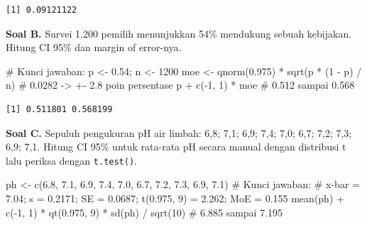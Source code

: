 \documentclass[
  indonesian,
  letterpaper,
]{book}
\newenvironment{Shaded}{\begin{snugshade}}{\end{snugshade}}
\newcommand{\CommentTok}[1]{\textcolor[rgb]{0.37,0.37,0.37}{#1}}
\newcommand{\DecValTok}[1]{\textcolor[rgb]{0.68,0.00,0.00}{#1}}
\newcommand{\FloatTok}[1]{\textcolor[rgb]{0.68,0.00,0.00}{#1}}
\newcommand{\FunctionTok}[1]{\textcolor[rgb]{0.28,0.35,0.67}{#1}}
\newcommand{\NormalTok}[1]{\textcolor[rgb]{0.00,0.23,0.31}{#1}}
\newcommand{\OtherTok}[1]{\textcolor[rgb]{0.00,0.23,0.31}{#1}}
\newcommand{\SpecialCharTok}[1]{\textcolor[rgb]{0.37,0.37,0.37}{#1}}
\begin{document}
\begin{verbatim}
[1] 0.09121122
\end{verbatim}

\textbf{Soal B.} Survei 1.200 pemilih menunjukkan 54\% mendukung sebuah
kebijakan. Hitung CI 95\% dan margin of error-nya.

\begin{Shaded}
\begin{Highlighting}[]
\CommentTok{\# Kunci jawaban:}
\NormalTok{p }\OtherTok{\textless{}{-}} \FloatTok{0.54}\NormalTok{; n }\OtherTok{\textless{}{-}} \DecValTok{1200}
\NormalTok{moe }\OtherTok{\textless{}{-}} \FunctionTok{qnorm}\NormalTok{(}\FloatTok{0.975}\NormalTok{) }\SpecialCharTok{*} \FunctionTok{sqrt}\NormalTok{(p }\SpecialCharTok{*}\NormalTok{ (}\DecValTok{1} \SpecialCharTok{{-}}\NormalTok{ p) }\SpecialCharTok{/}\NormalTok{ n)   }\CommentTok{\# 0.0282 {-}\textgreater{} +{-} 2.8 poin persentase}
\NormalTok{p }\SpecialCharTok{+} \FunctionTok{c}\NormalTok{(}\SpecialCharTok{{-}}\DecValTok{1}\NormalTok{, }\DecValTok{1}\NormalTok{) }\SpecialCharTok{*}\NormalTok{ moe                            }\CommentTok{\# 0.512 sampai 0.568}
\end{Highlighting}
\end{Shaded}

\begin{verbatim}
[1] 0.511801 0.568199
\end{verbatim}

\textbf{Soal C.} Sepuluh pengukuran pH air limbah: 6,8; 7,1; 6,9; 7,4;
7,0; 6,7; 7,2; 7,3; 6,9; 7,1. Hitung CI 95\% untuk rata-rata pH secara
manual dengan distribusi t lalu periksa dengan \texttt{t.test()}.

\begin{Shaded}
\begin{Highlighting}[]
\NormalTok{ph }\OtherTok{\textless{}{-}} \FunctionTok{c}\NormalTok{(}\FloatTok{6.8}\NormalTok{, }\FloatTok{7.1}\NormalTok{, }\FloatTok{6.9}\NormalTok{, }\FloatTok{7.4}\NormalTok{, }\FloatTok{7.0}\NormalTok{, }\FloatTok{6.7}\NormalTok{, }\FloatTok{7.2}\NormalTok{, }\FloatTok{7.3}\NormalTok{, }\FloatTok{6.9}\NormalTok{, }\FloatTok{7.1}\NormalTok{)}
\CommentTok{\# Kunci jawaban:}
\CommentTok{\# x{-}bar = 7.04; s = 0.2171; SE = 0.0687; t(0.975, 9) = 2.262; MoE = 0.155}
\FunctionTok{mean}\NormalTok{(ph) }\SpecialCharTok{+} \FunctionTok{c}\NormalTok{(}\SpecialCharTok{{-}}\DecValTok{1}\NormalTok{, }\DecValTok{1}\NormalTok{) }\SpecialCharTok{*} \FunctionTok{qt}\NormalTok{(}\FloatTok{0.975}\NormalTok{, }\DecValTok{9}\NormalTok{) }\SpecialCharTok{*} \FunctionTok{sd}\NormalTok{(ph) }\SpecialCharTok{/} \FunctionTok{sqrt}\NormalTok{(}\DecValTok{10}\NormalTok{)   }\CommentTok{\# 6.885 sampai 7.195}
\end{Highlighting}
\end{Shaded}
\end{document}
